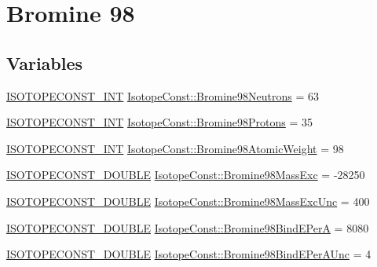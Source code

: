 \hypertarget{group___isotope_const-_bromine-_br98}{}\section{Bromine 98}
\label{group___isotope_const-_bromine-_br98}
\subsection*{Variables}
\begin{DoxyCompactItemize}
\item 
\mbox{\hyperlink{group___isotope_const-_macros_ga5f18360b3e99483a35c32d789e62621c}{I\+S\+O\+T\+O\+P\+E\+C\+O\+N\+S\+T\+\_\+\+I\+NT}} \mbox{\hyperlink{group___isotope_const-_bromine-_br98_ga07e4261f98331ec0d9589722054b2b31}{Isotope\+Const\+::\+Bromine98\+Neutrons}} = 63
\item 
\mbox{\hyperlink{group___isotope_const-_macros_ga5f18360b3e99483a35c32d789e62621c}{I\+S\+O\+T\+O\+P\+E\+C\+O\+N\+S\+T\+\_\+\+I\+NT}} \mbox{\hyperlink{group___isotope_const-_bromine-_br98_gaaf9fbe91420f5a3840a2811de7618825}{Isotope\+Const\+::\+Bromine98\+Protons}} = 35
\item 
\mbox{\hyperlink{group___isotope_const-_macros_ga5f18360b3e99483a35c32d789e62621c}{I\+S\+O\+T\+O\+P\+E\+C\+O\+N\+S\+T\+\_\+\+I\+NT}} \mbox{\hyperlink{group___isotope_const-_bromine-_br98_ga715faec93926eb627a36cedb1a89fbe8}{Isotope\+Const\+::\+Bromine98\+Atomic\+Weight}} = 98
\item 
\mbox{\hyperlink{group___isotope_const-_macros_ga8f45a7272ce02c0b4c65c44636ed719a}{I\+S\+O\+T\+O\+P\+E\+C\+O\+N\+S\+T\+\_\+\+D\+O\+U\+B\+LE}} \mbox{\hyperlink{group___isotope_const-_bromine-_br98_gaa92f2672e5c2530a5bc13a5a1912d211}{Isotope\+Const\+::\+Bromine98\+Mass\+Exc}} = -\/28250
\item 
\mbox{\hyperlink{group___isotope_const-_macros_ga8f45a7272ce02c0b4c65c44636ed719a}{I\+S\+O\+T\+O\+P\+E\+C\+O\+N\+S\+T\+\_\+\+D\+O\+U\+B\+LE}} \mbox{\hyperlink{group___isotope_const-_bromine-_br98_ga18e634f9e4cd9b0c930049d73288ddd9}{Isotope\+Const\+::\+Bromine98\+Mass\+Exc\+Unc}} = 400
\item 
\mbox{\hyperlink{group___isotope_const-_macros_ga8f45a7272ce02c0b4c65c44636ed719a}{I\+S\+O\+T\+O\+P\+E\+C\+O\+N\+S\+T\+\_\+\+D\+O\+U\+B\+LE}} \mbox{\hyperlink{group___isotope_const-_bromine-_br98_ga67738674fe2349dc3b864a8f750b116d}{Isotope\+Const\+::\+Bromine98\+Bind\+E\+PerA}} = 8080
\item 
\mbox{\hyperlink{group___isotope_const-_macros_ga8f45a7272ce02c0b4c65c44636ed719a}{I\+S\+O\+T\+O\+P\+E\+C\+O\+N\+S\+T\+\_\+\+D\+O\+U\+B\+LE}} \mbox{\hyperlink{group___isotope_const-_bromine-_br98_gae8cfd7c14cc054823897669173dca3d9}{Isotope\+Const\+::\+Bromine98\+Bind\+E\+Per\+A\+Unc}} = 4

\end{DoxyCompactItemize}
